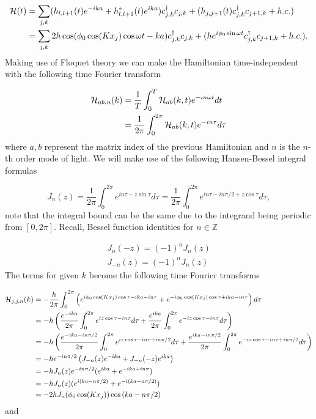 \begin{align}
  \mathcal{H}(t) &= \sum_{j,k} ( h_{l,l+1}(t) e^{-ika} + h_{l,l+1}^*(t) e^{ika}) c^{\dagger}_{j,k} c_{j,k} + (h_{j,j+1}(t) c^{\dagger}_{j,k} c_{j+1,k} + h.c.) \\
  &= \sum_{j,k} 2h\cos( \phi_0 \cos(Kx_j) \cos \omega t - ka ) c^{\dagger}_{j,k} c_{j,k} + (h e^{i\phi_0 \sin \omega t} c^{\dagger}_{j,k} c_{j+1,k} + h.c.).
\end{align}
Making use of Floquet theory we can make the Hamiltonian time-independent with the following time Fourier transform

\begin{align}
  \mathcal{H}_{ab,n}(k) &= \dfrac{1}{T} \int_0^T \mathcal{H}_{ab}(k,t) e^{-in \omega t} dt \\
  &= \dfrac{1}{2\pi} \int_0^{2\pi} \mathcal{H}_{ab}(k,t) e^{-in\tau} d\tau
\end{align}
where $a,b$ represent the matrix index of the previous Hamiltonian and $n$ is the $n$-th order mode of light.
We will make use of the following Hansen-Bessel integral formulas

\begin{equation} \label{eq: hansen-bessel}
  J_n(z) = \dfrac{1}{2\pi} \int_0^{2\pi} e^{in\tau - z \sin\tau} d\tau = \dfrac{1}{2\pi} \int_0^{2\pi} e^{in\tau - in\pi/2 + z\cos\tau} d\tau,
\end{equation}
note that the integral bound can be the same due to the integrand being periodic from $[0,2\pi]$.
Recall, Bessel function identities for $n \in \mathbb{Z}$

\begin{align}
  J_n(-z) = (-1)^n J_n(z) \\
  J_{-n}(z) = (-1)^n J_n(z)
\end{align}
The terms for given $k$ become the following time Fourier transforms

\begin{align}
  \mathcal{H}_{j,j,n}(k) &= -\dfrac{h}{2\pi} \int_0^{2\pi} \left( e^{i \phi_0 \cos(Kx_j) \cos \tau - ika - in\tau} + e^{-i \phi_0 \cos(Kx_j) \cos \tau + ika - in\tau} \right) d\tau \nonumber \\
    &= -h \left( \dfrac{e^{-ika}}{2\pi} \int_0^{2\pi} e^{i z \cos \tau - in\tau} d\tau + \dfrac{e^{ika}}{2\pi} \int_0^{2\pi} e^{-i z \cos \tau - in\tau} d\tau \right) \nonumber \\
    &= -h \left( \dfrac{e^{-ika -in\pi/2}}{2\pi} \int_0^{2\pi} e^{i z \cos \tau - in\tau + in\pi/2} d\tau + \dfrac{e^{ika - in\pi/2}}{2\pi} \int_0^{2\pi} e^{-i z \cos \tau - in\tau + in\pi/2} d\tau \right) \nonumber \\
    &= -h e^{-in\pi/2} \left( J_{-n}(z) e^{-ika} + J_{-n}(-z) e^{ika} \right) \nonumber \\
    &= -h J_n(z) e^{-in\pi/2} ( e^{ika} +  e^{-ika+in\pi} ) \nonumber \\
    &= -h J_n(z) ( e^{i(ka-n\pi/2)} +  e^{-i(ka-n\pi/2)} ) \nonumber \\
    &= -2h J_n(\phi_0 \cos(Kx_j)) \cos \left( ka -n\pi/2 \right)
\end{align}
and

